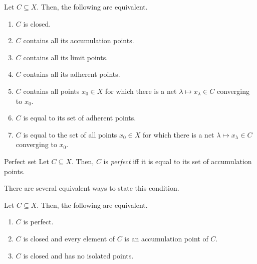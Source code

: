 \begin{thm}{}{}
Let $C\subseteq X$.  Then, the following are equivalent.
\begin{enumerate}
\item $C$ is closed.
\item $C$ contains all its accumulation points.
\item $C$ contains all its limit points.
\item $C$ contains all its adherent points.
\item $C$ contains all points $x_0\in X$ for which there is a net $\lambda \mapsto x_{\lambda}\in C$ converging to $x_0$.
\item $C$ is equal to its set of adherent points.
\item $C$ is equal to the set of all points $x_0\in X$ for which there is a net $\lambda \mapsto x_{\lambda}\in C$ converging to $x_0$.
\end{enumerate}
\end{thm}
\begin{dfn}{Perfect set}{}
Let $C\subseteq X$.  Then, $C$ is \emph{perfect} iff it is equal to its set of accumulation points.
\end{dfn}
There are several equivalent ways to state this condition.
\begin{prp}{}{}
Let $C\subseteq X$.  Then, the following are equivalent.
\begin{enumerate}
\item $C$ is perfect.
\item $C$ is closed and every element of $C$ is an accumulation point of $C$.
\item $C$ is closed and has no isolated points.
\end{enumerate}
\end{prp}

